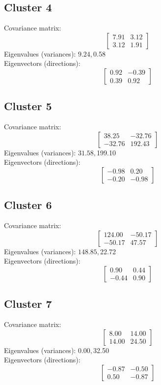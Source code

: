 \documentclass{article}
\begin{document}
\subsection*{Cluster 4}
Covariance matrix:
\[\begin{bmatrix}7.91 & 3.12 \\3.12 & 1.91\end{bmatrix}\]
Eigenvalues (variances): $ 9.24, $0.58\\
Eigenvectors (directions):
\[\begin{bmatrix}0.92 & -0.39 \\0.39 & 0.92\end{bmatrix}\]
\subsection*{Cluster 5}
Covariance matrix:
\[\begin{bmatrix}38.25 & -32.76 \\-32.76 & 192.43\end{bmatrix}\]
Eigenvalues (variances): $ 31.58, $199.10\\
Eigenvectors (directions):
\[\begin{bmatrix}-0.98 & 0.20 \\-0.20 & -0.98\end{bmatrix}\]
\subsection*{Cluster 6}
Covariance matrix:
\[\begin{bmatrix}124.00 & -50.17 \\-50.17 & 47.57\end{bmatrix}\]
Eigenvalues (variances): $ 148.85, $22.72\\
Eigenvectors (directions):
\[\begin{bmatrix}0.90 & 0.44 \\-0.44 & 0.90\end{bmatrix}\]
\subsection*{Cluster 7}
Covariance matrix:
\[\begin{bmatrix}8.00 & 14.00 \\14.00 & 24.50\end{bmatrix}\]
Eigenvalues (variances): $ 0.00, $32.50\\
Eigenvectors (directions):
\[\begin{bmatrix}-0.87 & -0.50 \\0.50 & -0.87\end{bmatrix}\]
\end{document}
